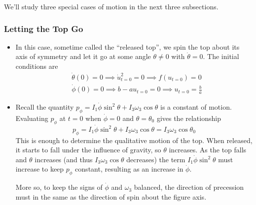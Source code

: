 \documentclass[11pt, a4paper]{article}
\begin{document}
\begin{itemize}
	We'll study three special cases of motion in the next three subsections.
	
\iffalse	
	There are three main cases of physical motion depending on the sign of $ \dot{\phi} $ at $ f(u) $'s roots $ u_{1} $ and $ u_{2} $.
	\begin{enumerate}
		\item $ \dot{\phi}(u_1) > 0 $ and $ \dot{\phi}(u_2) > 0 $ 
		\item $ \dot{\phi}(u_1) > 0 $ and $ \dot{\phi}(u_2) < 0 $ 
		\item $ \dot{\phi}(u_1) > 0 $ and $ \dot{\phi}(u_2) = 0 $ 
	\end{enumerate}
\fi
\end{itemize}

\subsubsection{Letting the Top Go}
\begin{itemize}
	\item In this case, sometime called the ``released top'', we spin the top about its axis of symmetry and let it go at some angle $ \theta \neq 0 $ with $ \dot{\theta} = 0 $. The initial conditions are
	\begin{align*}
		&\dot{\theta}(0) = 0 \implies \dot{u}_{t=0}^{2} = 0 \implies f(u_{t=0}) = 0 \\
		&\dot{\phi}(0) = 0 \implies b - au_{t=0} = 0 \implies u_{t=0} = \frac{b}{a}
	\end{align*}
	
	\item Recall the quantity $ p_{\phi} = I_{1} \dot{\phi} \sin^{2} \theta + I_{3} \omega_{3} \cos \theta $ is a constant of motion. Evaluating $ p_{\phi} $ at $ t = 0 $ when $ \dot{\phi} = 0 $ and $ \theta = \theta_{0} $ gives the relationship
	\begin{equation*}
		p_{\phi} = I_{1} \dot{\phi} \sin^{2} \theta + I_{3} \omega_{3} \cos \theta = I_{3} \omega_{3} \cos \theta_{0}
	\end{equation*}
	This is enough to determine the qualitative motion of the top. When released, it starts to fall under the influence of gravity, so $ \theta $ increases. As the top falls and $ \theta $ increases (and thus $ I_{3}\omega_{3} \cos \theta $ decreases) the term $ I_{1}\dot{\phi}\sin^{2}\theta $ must increase to keep $ p_{\phi} $ constant, resulting as an increase in $ \dot \phi $. 
	
	More so, to keep the signs of $ \dot{\phi} $ and $ \omega_{3} $ balanced, the direction of precession must in the same as the direction of spin about the figure axis.
	
	
\end{itemize}
\end{document}
